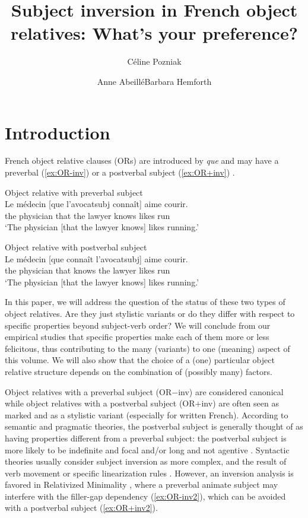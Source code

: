 \documentclass[output=paper]{langscibook}
\author{Céline Pozniak\affiliation{
Université de Paris, Laboratoire de linguistique formelle}\and Anne Abeillé\affiliation{
Université de Paris, Laboratoire de linguistique formelle}\lastand  Barbara Hemforth\affiliation{Université de Paris, Laboratoire de linguistique formelle, CNRS}}
\title{Subject inversion in French object   relatives: What’s your preference?}
\begin{document}
\maketitle


\section{Introduction} 
French object relative clauses (ORs) are introduced by \textit{que} and may have a preverbal (\ref{ex:OR-inv}) or a postverbal subject (\ref{ex:OR+inv})  \citep{LeBidoisR1950, kayne1978}.


\begin{exe}
\ex Object relative with preverbal subject\label{ex:OR-inv}\\ 
\gll Le médecin [que l'avocat{\tiny subj} connaît] aime courir.\\   
the physician that {the lawyer} knows likes run\\
\glt `The physician [that the lawyer knows] likes running.'

\ex Object relative with postverbal subject\label{ex:OR+inv}\\  
\gll Le médecin [que connaît l'avocat{\tiny subj}] aime courir.\\    
the physician that knows {the lawyer}  likes run\\
\glt `The physician [that the lawyer knows] likes running.'
\end{exe}


In this paper, we will address the question of the status of these two
types of object relatives. Are they just stylistic variants or do they
differ with respect to specific properties beyond subject-verb order?
We will conclude from our empirical studies that specific properties
make each of them more or less felicitous, thus contributing to the
many (variants) to one (meaning) aspect of this volume. We will also
show that the choice of a (one) particular object relative structure
depends on the combination of (possibly many) factors.

\begin{sloppypar}
  Object relatives with a preverbal subject (OR$-$inv) are considered
  canonical while object relatives with a postverbal subject
  (OR$+$inv) are often seen as marked and as a stylistic variant
  (especially for written French).  According to semantic and
  pragmatic theories, the postverbal subject is generally thought of
  as having properties different from a preverbal subject: the
  postverbal subject is more likely to be indefinite and focal
  \citep{Lahousse2011} and/or long and not agentive \citep{Fuchs2006,
    marandin2011}.  Syntactic theories usually consider subject
  inversion as more complex, and the result of verb movement
  \citep{deprez1990two, HulkPollock2001} or specific linearization
  rules \citep{Bonami}. However, an inversion analysis is favored in
  Relativized Minimality \citep{rizzi1990, Friedmann2009}, where a
  preverbal animate subject may interfere with the filler-gap
  dependency (\ref{ex:OR-inv2}), which can be avoided with a
  postverbal subject (\ref{ex:OR+inv2}).
\end{sloppypar}
\end{document}
